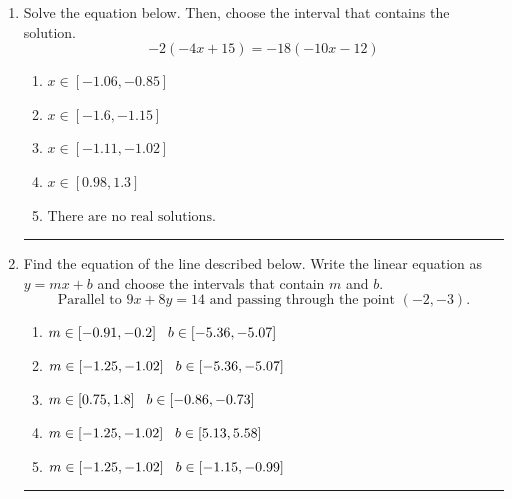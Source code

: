 \documentclass[14pt]{extbook}
\newcommand{\litem}[1]{\item#1\hspace*{-1cm}\rule{\textwidth}{0.4pt}}
\begin{document}
\begin{enumerate}
{\begin{enumerate}[label=\Alph*.]
\end{enumerate} }
\litem{
Solve the equation below. Then, choose the interval that contains the solution.\[ -2(-4x + 15) = -18(-10x -12) \]\begin{enumerate}[label=\Alph*.]
\item \( x \in [-1.06, -0.85] \)
\item \( x \in [-1.6, -1.15] \)
\item \( x \in [-1.11, -1.02] \)
\item \( x \in [0.98, 1.3] \)
\item \( \text{There are no real solutions.} \)

\end{enumerate} }
\litem{
Find the equation of the line described below. Write the linear equation as $ y=mx+b $ and choose the intervals that contain $m$ and $b$.\[ \text{Parallel to } 9 x + 8 y = 14 \text{ and passing through the point } (-2, -3). \]\begin{enumerate}[label=\Alph*.]
\item \( m \in [-0.91, -0.2] \hspace*{3mm} b \in [-5.36, -5.07] \)
\item \( m \in [-1.25, -1.02] \hspace*{3mm} b \in [-5.36, -5.07] \)
\item \( m \in [0.75, 1.8] \hspace*{3mm} b \in [-0.86, -0.73] \)
\item \( m \in [-1.25, -1.02] \hspace*{3mm} b \in [5.13, 5.58] \)
\item \( m \in [-1.25, -1.02] \hspace*{3mm} b \in [-1.15, -0.99] \)


\end{enumerate}}
\end{enumerate}
\end{document}
